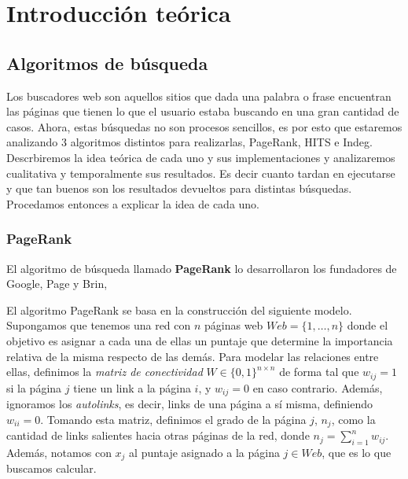 \section{Introducci\'on te\'orica}

\subsection{Algoritmos de búsqueda}

Los buscadores web son aquellos sitios que dada una palabra o frase encuentran las páginas que tienen lo que el usuario estaba buscando en una gran cantidad de casos. Ahora, estas búsquedas no son procesos sencillos, es por esto que estaremos analizando 3 algoritmos distintos para realizarlas, PageRank, HITS e Indeg. Descrbiremos la idea teórica de cada uno y  sus implementaciones y analizaremos cualitativa y temporalmente sus resultados. Es decir cuanto tardan en ejecutarse y que tan buenos son los resultados devueltos para distintas búsquedas. Procedamos entonces a explicar la idea de cada uno.

\subsubsection{PageRank}

El algoritmo de búsqueda llamado \textbf{PageRank} lo desarrollaron los fundadores de Google, Page y Brin, 

El algoritmo PageRank se basa en la construcci\'on del siguiente modelo. Supongamos que tenemos una red con $n$ p\'aginas 
web $Web = \{1,\dots,n\}$ donde
el objetivo es asignar a cada una de ellas un puntaje que determine la importancia relativa de la misma respecto de las
dem\'as. Para modelar las relaciones entre ellas, definimos la \emph{matriz de conectividad} $W \in \{0,1\}^{n \times n}$ 
de forma tal que $w_{ij} = 1$ si la p\'agina $j$ tiene un link a la p\'agina $i$, y $w_{ij} = 0$ en caso contrario. 
Adem\'as, ignoramos los \emph{autolinks}, es decir, links de una p\'agina a s\'i misma, definiendo $w_{ii} = 0$. Tomando 
esta matriz, definimos el grado de la p\'agina $j$, $n_j$, como la cantidad de links salientes hacia otras p\'aginas 
de la red, donde $n_j = \sum_{i = 1}^n w_{ij}$. Adem\'as, notamos con $x_j$ al puntaje asignado a la p\'agina $j\in
Web$, que es lo que buscamos calcular.

